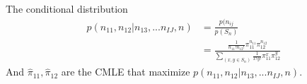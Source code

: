 \documentclass[11pt]{article} %
\begin{document}
\begin{itemize}
The conditional distribution
\begin{align*}
	p(n_{11}, n_{12}|n_{13}, ...n_{IJ}, n) &= \frac{p(n_{ij}}{p(S_n)}\\
	&= \frac{\frac{1}{n_{11}! n_{12}! } \pi_{11}^{n_{11}} \pi_{12}^{n_{12}}}{\sum_{(x, y \in S_n)} \frac{1}{x! y!} \pi_{11}^x \pi_{12}^y}
\end{align*}
And $\hat{\pi}_{11}, \hat{\pi}_{12}$ are the CMLE that maximize $p(n_{11}, n_{12}|n_{13}, ...n_{IJ}, n)$.

\end{itemize}
\end{document}
